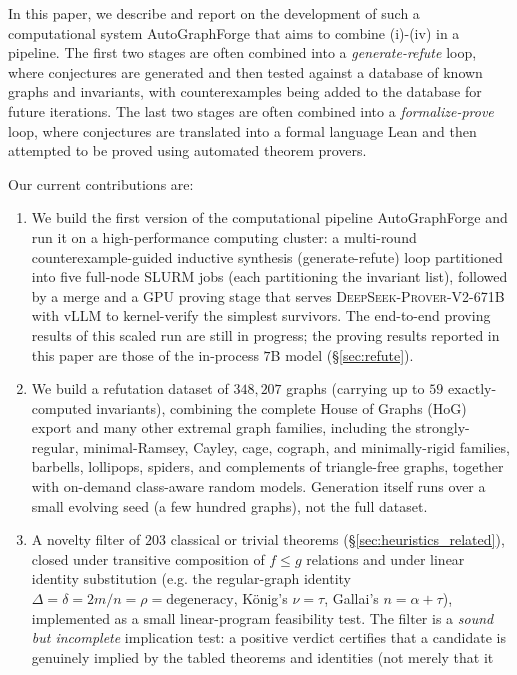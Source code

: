 \documentclass[]{ceurart}
\begin{document}
In this paper, we describe and report on the development of such a computational system \textsf{AutoGraphForge} that aims to combine (i)-(iv) in a pipeline. The first two stages are often combined into a \emph{generate-refute} loop, where conjectures are generated and then tested against a database of known graphs and invariants, with counterexamples being added to the database for future iterations. The last two stages are often combined into a \emph{formalize-prove} loop, where conjectures are translated into a formal language Lean and then attempted to be proved using automated theorem provers.

Our current contributions are:

\begin{enumerate}
  \item We build the first version of the computational pipeline \textsf{AutoGraphForge} and run it on a
  high-performance computing cluster: a multi-round counterexample-guided inductive synthesis
  (generate-refute) loop partitioned into five full-node SLURM jobs
  (each partitioning the invariant list), followed by a merge and a GPU proving stage that serves
  \textsc{DeepSeek-Prover-V2-671B} with vLLM to kernel-verify the simplest survivors. The end-to-end
  proving results of this scaled run are still in progress; the proving results reported in this
  paper are those of the in-process $7$B model (\S\ref{sec:refute}).
  \item We build a refutation dataset of $348{,}207$ graphs (carrying up to
  $59$ exactly-computed invariants), combining the complete House of Graphs (HoG)~\cite{coolsaet2023house} export and many other extremal graph families, including the strongly-regular, minimal-Ramsey,
  Cayley, cage, cograph, and minimally-rigid families, barbells, lollipops, spiders, and complements of
  triangle-free graphs, together with on-demand class-aware random models. Generation itself runs over a small evolving
  seed (a few hundred graphs), not the full dataset.
  \item A novelty filter of $203$ classical or trivial theorems
  (\S\ref{sec:heuristics_related}), closed under transitive composition of $f\le g$
  relations and under linear identity substitution (e.g. the regular-graph
  identity $\Delta=\delta=2m/n=\rho=\mathrm{degeneracy}$, K\"onig's $\nu=\tau$,
  Gallai's $n=\alpha+\tau$), implemented as a small linear-program feasibility
  test. The filter is a \emph{sound but incomplete} implication test: a positive verdict certifies
  that a candidate is genuinely implied by the tabled theorems and identities (not merely that it

\end{enumerate}
\end{document}
